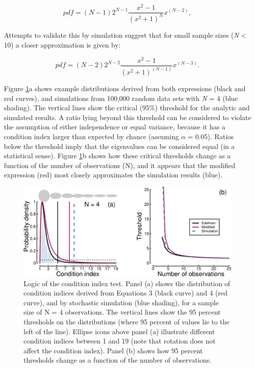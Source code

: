 \documentclass[]{article}
\begin{document}
\begin{equation}
\label{eq:edelman1}
pdf = (N-1)2^{N-1}\frac{x^2 - 1}{(x^2 + 1)^N}x^{(N-2)},
\end{equation}

Attempts to validate this by simulation suggest that for small sample sizes (\emph{N} \textless{} 10) a closer approximation is given by:

\begin{equation}
\label{eq:edelman2}
pdf = (N-2)2^{N-2}\frac{x^2 - 1}{(x^2 + 1)^{(N-1)}}x^{(N-3)}.
\end{equation}

Figure \ref{fig:distcomparison}a shows example distributions derived from both expressions (black and red curves), and simulations from 100,000 random data sets with \emph{N} = 4 (blue shading). The vertical lines show the critical (95\%) threshold for the analytic and simulated results. A ratio lying beyond this threshold can be considered to violate the assumption of either independence or equal variance, because it has a condition index larger than expected by chance (assuming \(\alpha\) = 0.05). Ratios below the threshold imply that the eigenvalues can be considered equal (in a statistical sense). Figure \ref{fig:distcomparison}b shows how these critical thresholds change as a function of the number of observations (N), and it appears that the modified expression (red) most closely approximates the simulation results (blue).

\begin{figure}

{\centering \includegraphics{manuscript_files/figure-latex/distcomparison-1} 

}

\caption{Logic of the condition index test. Panel (a) shows the distribution of condition indices derived from Equations 3 (black curve) and 4 (red curve), and by stochastic simulation (blue shading), for a sample size of N = 4 observations. The vertical lines show the 95 percent thresholds on the distributions (where 95 percent of values lie to the left of the line). Ellipse icons above panel (a) illustrate different condition indices between 1 and 19 (note that rotation does not affect the condition index). Panel (b) shows how 95 percent thresholds change as a function of the number of observations.}\label{fig:distcomparison}
\end{figure}
\end{document}
